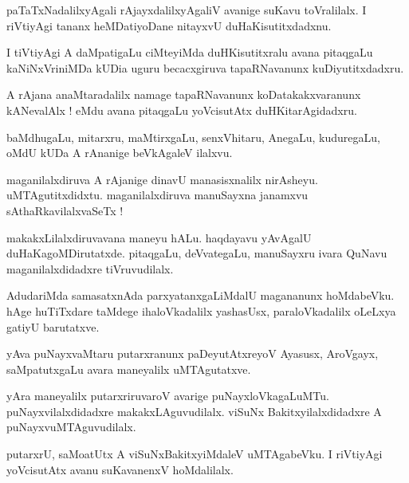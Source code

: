 \documentclass{article}
\begin{document}
\begin{mn}%
paTaTxNadalilxyAgali rAjayxdalilxyAgaliV avanige suKavu toVralilalx. I riVtiyAgi tananx 
heMDatiyoDane nitayxvU duHaKisutitxdadxnu.
\end{mn}

\begin{mn}%
I tiVtiyAgi A daMpatigaLu ciMteyiMda duHKisutitxralu avana pitaqgaLu kaNiNxVriniMDa kUDia uguru 
becacxgiruva tapaRNavanunx kuDiyutitxdadxru.
\end{mn}

\begin{mn}%
A rAjana anaMtaradalilx namage tapaRNavanunx koDatakakxvaranunx kANevalAlx ! eMdu avana pitaqgaLu 
yoVcisutAtx duHKitarAgidadxru.
\end{mn}

\begin{mn}%
baMdhugaLu, mitarxru, maMtirxgaLu, senxVhitaru, AnegaLu, kuduregaLu, oMdU kUDa A rAnanige 
beVkAgaleV ilalxvu.
\end{mn}

\begin{mn}%
maganilalxdiruva A rAjanige dinavU manasisxnalilx nirAsheyu. uMTAgutitxdidxtu. maganilalxdiruva 
manuSayxna janamxvu sAthaRkavilalxvaSeTx !
\end{mn}

\begin{mn}%
makakxLilalxdiruvavana maneyu hALu. haqdayavu yAvAgalU duHaKagoMDirutatxde. pitaqgaLu, deVvategaLu, 
manuSayxru ivara QuNavu maganilalxdidadxre tiVruvudilalx.
\end{mn}

\begin{mn}%
AdudariMda samasatxnAda parxyatanxgaLiMdalU magananunx hoMdabeVku. hAge huTiTxdare taMdege 
ihaloVkadalilx yashasUsx, paraloVkadalilx oLeLxya gatiyU barutatxve.
\end{mn}

\begin{mn}%
yAva puNayxvaMtaru putarxranunx paDeyutAtxreyoV Ayasusx, AroVgayx, saMpatutxgaLu avara maneyalilx 
uMTAgutatxve.
\end{mn}

\begin{mn}%
yAra maneyalilx putarxriruvaroV avarige puNayxloVkagaLuMTu. puNayxvilalxdidadxre 
makakxLAguvudilalx. viSuNx Bakitxyilalxdidadxre A puNayxvuMTAguvudilalx.
\end{mn}

\begin{mn}%
putarxrU, saMoatUtx A viSuNxBakitxyiMdaleV uMTAgabeVku. I riVtiyAgi yoVcisutAtx avanu suKavanenxV 
hoMdalilalx.
\end{mn}
\end{document}
